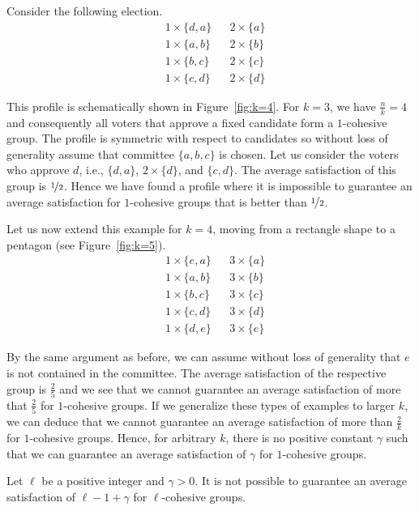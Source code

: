 \documentclass[envcountsame]{llncs}
\begin{document}
\begin{example}\label{example}
Consider the following election.
	\begin{align*}
		&1 \times \{ d,a\} & & 2 \times \{ a\} \\
		&1 \times \{ a,b\} & & 2 \times \{ b\} \\		
		&1 \times \{ b,c\} & & 2 \times \{ c\} \\
		&1 \times \{ c,d\} & & 2 \times \{ d\} 
	\end{align*}

This profile is schematically shown in Figure~\ref{fig:k=4}. For $k=3$, we have $\frac{n}{k}=4$ and 
consequently all voters that approve a fixed candidate form a $1$-cohesive group. The profile is symmetric with 
respect to candidates so without loss of generality assume that committee $\{a,b,c\}$ is chosen. Let us consider 
the voters who approve $d$, i.e., $\{d,a\}$, $2\times \{d\}$, and $\{c,d\}$. The average satisfaction of 
this group is $\nicefrac{1}{2}$. Hence we have found a profile where it is impossible to guarantee an average 
satisfaction for $1$-cohesive groups that is better than $\nicefrac{1}{2}$.

Let us now extend this example for $k=4$, moving from a rectangle shape to a pentagon (see Figure~\ref{fig:k=5}).
	\begin{align*}
		&1 \times \{ e,a\} & & 3 \times \{ a\} \\
		&1 \times \{ a,b\} & & 3 \times \{ b\} \\		
		&1 \times \{ b,c\} & & 3 \times \{ c\} \\
		&1 \times \{ c,d\} & & 3 \times \{ d\} \\
		&1 \times \{ d,e\} & & 3 \times \{ e\} 		
	\end{align*}

By the same argument as before, we can assume without loss of generality that $e$ is not contained in the 
committee. The average satisfaction of the respective group is $\frac{2}{5}$ and we see that we 
cannot guarantee an average satisfaction of more that $\frac25$ for $1$-cohesive groups. 
If we generalize these types of examples to larger $k$, we can deduce that we cannot guarantee an average
satisfaction of more than $\frac{2}{k}$ for $1$-cohesive groups. Hence, for arbitrary $k$, there is no 
positive constant $\gamma$ such that we can guarantee an average satisfaction of $\gamma$ for 
$1$-cohesive groups.
\end{example}


\begin{proposition}
Let $\ell$ be a positive integer and $\gamma>0$.
It is not possible to guarantee an average satisfaction of $\ell-1+\gamma$ for $\ell$-cohesive groups.
\end{proposition}
\end{document}
